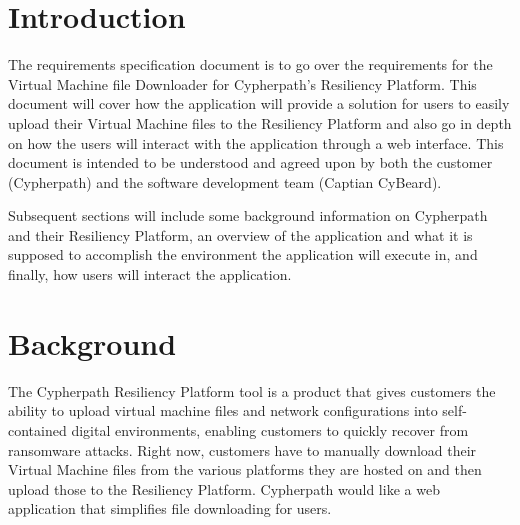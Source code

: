 \documentclass{article}
\begin{document}
    

    \tableofcontents
    \listoffigures

    \newpage
    \begin{versionhistory}
    \end{versionhistory}
    \newpage

    \section{Introduction}
    The requirements specification document is to go over the requirements for the Virtual Machine file Downloader for Cypherpath's Resiliency Platform.
    This document will cover how the application will provide a solution for users to easily upload their Virtual Machine files to the Resiliency Platform and also
    go in depth on how the users will interact with the application through a web interface. This document is intended to be understood and agreed
    upon by both the customer (Cypherpath) and the software development team (Captian CyBeard).

    Subsequent sections will include some background information on Cypherpath and their Resiliency Platform, an overview of the application and what it
    is supposed to accomplish the environment the application will execute in, and finally, how users will interact the application.


    \section{Background}
	The Cypherpath Resiliency Platform tool is a product that gives customers the ability to upload virtual machine files and network configurations into 
    self-contained digital environments, enabling customers to quickly recover from ransomware attacks. Right now, customers have to manually download their Virtual Machine files from
    the various platforms they are hosted on and then upload those to the Resiliency Platform. Cypherpath would like a web application that simplifies file downloading for users.
\end{document}
